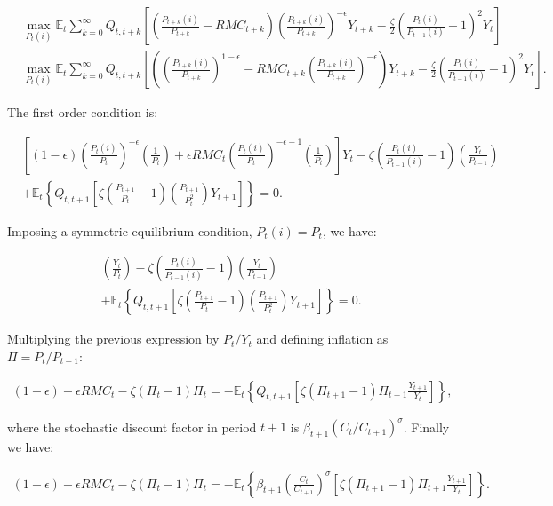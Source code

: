 \documentclass[11pt]{article}
\numberwithin{equation}{section}
\begin{document}
\begin{align*}
&\max_{P_t(i)} \mathbb{E}_t \sum_{k=0}^{\infty}Q_{t,t+k}\left[\left(\frac{P_{t+k}(i)}{P_{t+k}} - RMC_{t+k} \right)\left(\frac{P_{t+k}(i)}{P_{t+k}}\right)^{-\epsilon}Y_{t+k} - \frac{\zeta}{2}\left(\frac{P_t(i)}{P_{t-1}(i)}-1\right)^2Y_t\right]\\
&\max_{P_t(i)} \mathbb{E}_t \sum_{k=0}^{\infty}Q_{t,t+k}\left[\left(\left(\frac{P_{t+k}(i)}{P_{t+k}}\right)^{1-\epsilon} - RMC_{t+k}\left(\frac{P_{t+k}(i)}{P_{t+k}}\right)^{-\epsilon} \right)Y_{t+k} - \frac{\zeta}{2}\left(\frac{P_t(i)}{P_{t-1}(i)}-1\right)^2Y_t\right].
\end{align*}

The first order condition is:

\begin{align*}
&\left[(1-\epsilon)\left(\frac{P_{t}(i)}{P_{t}}\right)^{-\epsilon}\left(\frac{1}{P_t}\right)+\epsilon RMC_t \left(\frac{P_{t}(i)}{P_{t}}\right)^{-\epsilon-1}\left(\frac{1}{P_t}\right)\right]Y_t-\zeta\left(\frac{P_t(i)}{P_{t-1}(i)}-1\right)\left(\frac{Y_t}{P_{t-1}}\right)\\
&+\mathbb{E}_t\left\{Q_{t,t+1}\left[\zeta\left(\frac{P_{t+1}}{P_t}-1\right)\left(\frac{P_{t+1}}{P_t^2}\right)Y_{t+1}\right]\right\}=0.
\end{align*}

Imposing a symmetric equilibrium condition, $P_t(i)=P_t$, we have:

\begin{align*}
[(1-\epsilon)+\epsilon RMC_t]\left(\frac{Y_t}{P_t}\right)-\zeta\left(\frac{P_t(i)}{P_{t-1}(i)}-1\right)\left(\frac{Y_t}{P_{t-1}}\right)\\
+\mathbb{E}_t\left\{Q_{t,t+1}\left[\zeta\left(\frac{P_{t+1}}{P_t}-1\right)\left(\frac{P_{t+1}}{P_t^2}\right)Y_{t+1}\right]\right\}=0.
\end{align*}

Multiplying the previous expression by $P_t/Y_t$ and defining inflation as $\Pi=P_t/P_{t-1}$:

\begin{align*}
(1-\epsilon)+\epsilon RMC_t-\zeta(\Pi_t-1)\Pi_t=-\mathbb{E}_t\left\{Q_{t,t+1}\left[\zeta(\Pi_{t+1}-1)\Pi_{t+1}\frac{Y_{t+1}}{Y_t}\right]\right\},
\end{align*}

\noindent where the stochastic discount factor in period $t+1$ is $\beta_{t+1}(C_t/C_{t+1})^{\sigma}$. Finally we have:

\begin{align*}
(1-\epsilon)+\epsilon RMC_t-\zeta(\Pi_t-1)\Pi_t=-\mathbb{E}_t\left\{\beta_{t+1}\left(\frac{C_t}{C_{t+1}}\right)^{\sigma}\left[\zeta(\Pi_{t+1}-1)\Pi_{t+1}\frac{Y_{t+1}}{Y_t}\right]\right\}.
\end{align*}
\end{document}
